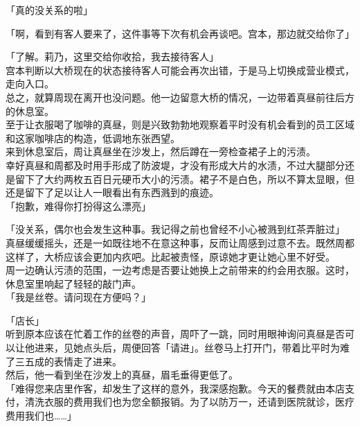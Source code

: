 「真的没关系的啦」

「啊，看到有客人要来了，这件事等下次有机会再谈吧。宫本，那边就交给你了」

「了解。莉乃，这里交给你收拾，我去接待客人」\\

宫本判断以大桥现在的状态接待客人可能会再次出错，于是马上切换成营业模式，走向入口。\\

总之，就算周现在离开也没问题。他一边留意大桥的情况，一边带着真昼前往后方的休息室。\\

至于让衣服喝了咖啡的真昼，则是兴致勃勃地观察着平时没有机会看到的员工区域和这家咖啡店的构造，低调地东张西望。\\

来到休息室后，周让真昼坐在沙发上，然后蹲在一旁检查裙子上的污渍。\\

幸好真昼和周都及时用手形成了防波堤，才没有形成大片的水渍，不过大腿部分还是留下了大约两枚五百日元硬币大小的污渍。裙子不是白色，所以不算太显眼，但还是留下了足以让人一眼看出有东西溅到的痕迹。\\

「抱歉，难得你打扮得这么漂亮」

「没关系，偶尔也会发生这种事。我记得之前也曾经不小心被溅到红茶弄脏过」\\

真昼缓缓摇头，还是一如既往地不在意这种事，反而让周感到过意不去。既然周都这样了，大桥应该会更加内疚吧。比起被责怪，原谅她才更让她心里不好受。\\

周一边确认污渍的范围，一边考虑是否要让她换上之前带来的约会用衣服。这时，休息室里响起了轻轻的敲门声。\\

「我是丝卷。请问现在方便吗？」

「店长」\\

听到原本应该在忙着工作的丝卷的声音，周吓了一跳，同时用眼神询问真昼是否可以让他进来，见她点头后，周便回答「请进」。丝卷马上打开门，带着比平时为难了三五成的表情走了进来。\\

然后，他一看到坐在沙发上的真昼，眉毛垂得更低了。\\

「难得您来店里作客，却发生了这样的意外，我深感抱歉。今天的餐费就由本店支付，清洗衣服的费用我们也为您全额报销。为了以防万一，还请到医院就诊，医疗费用我们也……」

